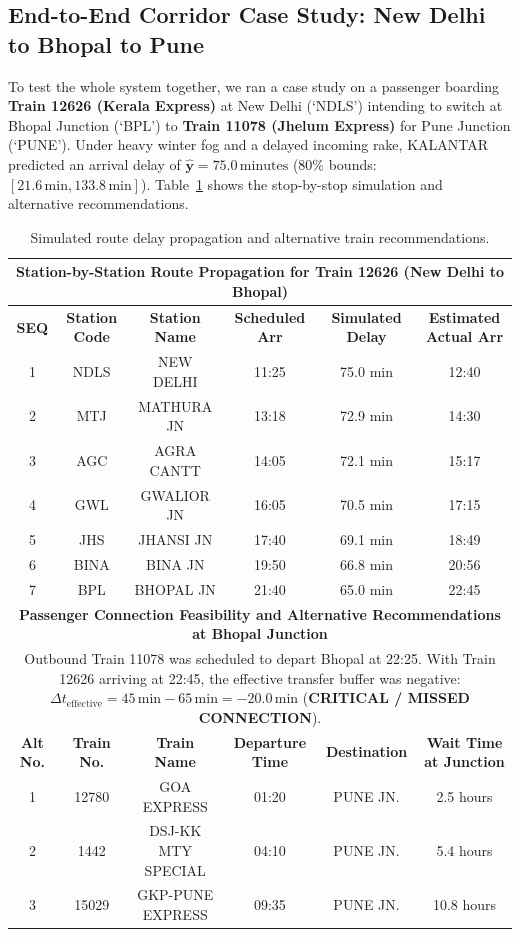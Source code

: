 \documentclass[11pt,a4paper]{article}
\begin{document}
\subsection{End-to-End Corridor Case Study: New Delhi to Bhopal to Pune}
To test the whole system together, we ran a case study on a passenger boarding \textbf{Train 12626 (Kerala Express)} at New Delhi (`NDLS') intending to switch at Bhopal Junction (`BPL') to \textbf{Train 11078 (Jhelum Express)} for Pune Junction (`PUNE'). Under heavy winter fog and a delayed incoming rake, KALANTAR predicted an arrival delay of $\mathbf{\hat{y} = 75.0\,\mathrm{minutes}}$ (80\% bounds: $[21.6\,\mathrm{min}, 133.8\,\mathrm{min}]$). Table~\ref{tab:corridor_simulation} shows the stop-by-stop simulation and alternative recommendations.

\begin{table}[!ht]
\centering
\small
\caption{Simulated route delay propagation and alternative train recommendations.}
\label{tab:corridor_simulation}
\begin{tabularx}{\textwidth}{cccccc}
\toprule
\multicolumn{6}{c}{\textbf{Station-by-Station Route Propagation for Train 12626 (New Delhi to Bhopal)}} \\
\midrule
\textbf{SEQ} & \textbf{Station Code} & \textbf{Station Name} & \textbf{Scheduled Arr} & \textbf{Simulated Delay} & \textbf{Estimated Actual Arr} \\
1 & NDLS & NEW DELHI   & 11:25 & 75.0 min & 12:40 \\
2 & MTJ  & MATHURA JN  & 13:18 & 72.9 min & 14:30 \\
3 & AGC  & AGRA CANTT  & 14:05 & 72.1 min & 15:17 \\
4 & GWL  & GWALIOR JN  & 16:05 & 70.5 min & 17:15 \\
5 & JHS  & JHANSI JN   & 17:40 & 69.1 min & 18:49 \\
6 & BINA & BINA JN     & 19:50 & 66.8 min & 20:56 \\
7 & BPL  & BHOPAL JN   & 21:40 & 65.0 min & 22:45 \\
\midrule
\multicolumn{6}{c}{\textbf{Passenger Connection Feasibility and Alternative Recommendations at Bhopal Junction}} \\
\midrule
\multicolumn{6}{p{0.95\textwidth}}{Outbound Train 11078 was scheduled to depart Bhopal at 22:25. With Train 12626 arriving at 22:45, the effective transfer buffer was negative: $\Delta t_{\mathrm{effective}} = 45\,\mathrm{min} - 65\,\mathrm{min} = \mathbf{-20.0\,\mathrm{min}}$ (\textbf{CRITICAL / MISSED CONNECTION}).} \\
\midrule
\textbf{Alt No.} & \textbf{Train No.} & \textbf{Train Name} & \textbf{Departure Time} & \textbf{Destination} & \textbf{Wait Time at Junction} \\
1 & 12780 & GOA EXPRESS        & 01:20 & PUNE JN. & 2.5 hours \\
2 & 1442  & DSJ-KK MTY SPECIAL & 04:10 & PUNE JN. & 5.4 hours \\
3 & 15029 & GKP-PUNE EXPRESS   & 09:35 & PUNE JN. & 10.8 hours \\
\bottomrule
\end{tabularx}
\end{table}
\end{document}
